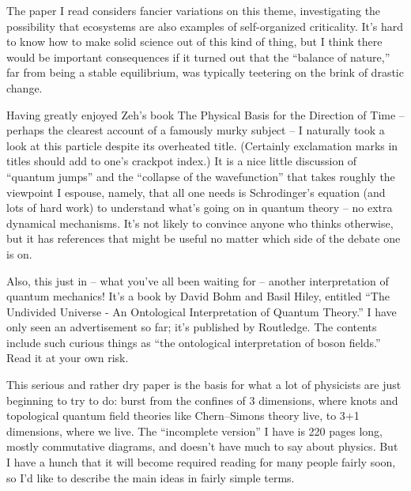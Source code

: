The paper I read considers fancier variations on this theme,
investigating the possibility that ecosystems are also examples of
self-organized criticality.  It's hard to know how to make solid science
out of this kind of thing, but I think there would be important
consequences if it turned out that the ``balance of nature,'' far from
being a stable equilibrium, was typically teetering on the brink of
drastic change.  


Having greatly enjoyed Zeh's book The Physical Basis for the Direction
of Time -- perhaps the clearest account of a famously murky subject -- I
naturally took a look at this particle despite its overheated title.  
(Certainly exclamation marks in titles should add to one's crackpot index.)
It is a nice little discussion of ``quantum jumps'' and the ``collapse of
the wavefunction'' that takes roughly the viewpoint I espouse, namely,
that all one needs is Schrodinger's equation (and lots of hard work) to
understand what's going on in quantum theory -- no extra dynamical
mechanisms.  It's not likely to convince anyone who thinks otherwise,
but it has references that might be useful no matter which side of the 
debate one is on.

Also, this just in -- what you've all been waiting for -- another
interpretation of quantum mechanics!  It's a book by David Bohm and
Basil Hiley, entitled ``The Undivided Universe - An Ontological
Interpretation of Quantum Theory.''  I have only seen an advertisement so
far; it's published by Routledge.  The contents include such curious
things as ``the ontological interpretation of boson fields.''  Read it at
your own risk.


This serious and rather dry paper is the basis for what a lot of 
physicists are just beginning to try to do: burst from the confines of 3
dimensions, where knots and topological quantum field theories like
Chern--Simons theory live, to 3+1 dimensions, where we live.  The
``incomplete version'' I have is 220 pages long, mostly commutative
diagrams, and doesn't have much to say about physics.  But I have a hunch
that it will become required reading for many people fairly soon, so 
I'd like to describe the main ideas in fairly simple terms.  

